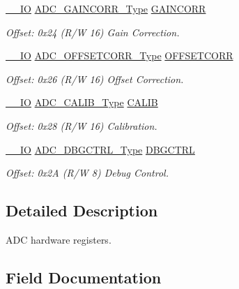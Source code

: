 \begin{DoxyCompactItemize}
\mbox{\hyperlink{core__cm0plus_8h_aec43007d9998a0a0e01faede4133d6be}{\+\_\+\+\_\+\+IO}} \mbox{\hyperlink{union_a_d_c___g_a_i_n_c_o_r_r___type}{A\+D\+C\+\_\+\+G\+A\+I\+N\+C\+O\+R\+R\+\_\+\+Type}} \mbox{\hyperlink{struct_adc_ad4d4aa9db75c451e2b6ecf78eac5b463}{G\+A\+I\+N\+C\+O\+RR}}
\begin{DoxyCompactList}\small\item\em Offset\+: 0x24 (R/W 16) Gain Correction. \end{DoxyCompactList}\item 
\mbox{\hyperlink{core__cm0plus_8h_aec43007d9998a0a0e01faede4133d6be}{\+\_\+\+\_\+\+IO}} \mbox{\hyperlink{union_a_d_c___o_f_f_s_e_t_c_o_r_r___type}{A\+D\+C\+\_\+\+O\+F\+F\+S\+E\+T\+C\+O\+R\+R\+\_\+\+Type}} \mbox{\hyperlink{struct_adc_ad3d1c8b252c6e69b36ef4d6be129a301}{O\+F\+F\+S\+E\+T\+C\+O\+RR}}
\begin{DoxyCompactList}\small\item\em Offset\+: 0x26 (R/W 16) Offset Correction. \end{DoxyCompactList}\item 
\mbox{\hyperlink{core__cm0plus_8h_aec43007d9998a0a0e01faede4133d6be}{\+\_\+\+\_\+\+IO}} \mbox{\hyperlink{union_a_d_c___c_a_l_i_b___type}{A\+D\+C\+\_\+\+C\+A\+L\+I\+B\+\_\+\+Type}} \mbox{\hyperlink{struct_adc_a6f3a9c186f781d5807f77cf20bf392fb}{C\+A\+L\+IB}}
\begin{DoxyCompactList}\small\item\em Offset\+: 0x28 (R/W 16) Calibration. \end{DoxyCompactList}\item 
\mbox{\hyperlink{core__cm0plus_8h_aec43007d9998a0a0e01faede4133d6be}{\+\_\+\+\_\+\+IO}} \mbox{\hyperlink{union_a_d_c___d_b_g_c_t_r_l___type}{A\+D\+C\+\_\+\+D\+B\+G\+C\+T\+R\+L\+\_\+\+Type}} \mbox{\hyperlink{struct_adc_aac818028dcd5dc0e679047a9986dbfb0}{D\+B\+G\+C\+T\+RL}}
\begin{DoxyCompactList}\small\item\em Offset\+: 0x2A (R/W 8) Debug Control. \end{DoxyCompactList}\end{DoxyCompactItemize}


\subsection{Detailed Description}
A\+DC hardware registers. 

\subsection{Field Documentation}
\mbox{\label{struct_adc_aac8d5b49ae8002fcd0e6bf0330319ad7}} 
